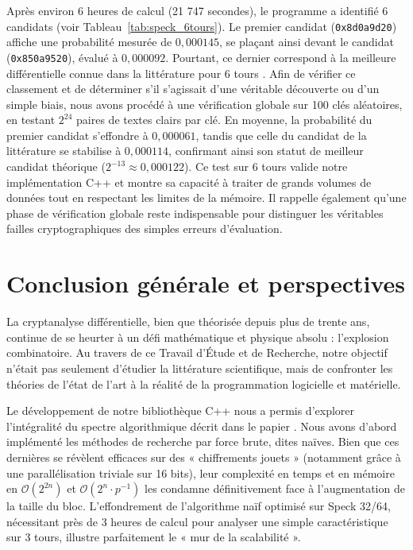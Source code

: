\documentclass[a4paper,11pt]{article}
\begin{document}
Après environ 6 heures de calcul (21 747 secondes), le programme a identifié 6 candidats (voir Tableau~\ref{tab:speck_6tours}). Le premier candidat (\texttt{0x8d0a9d20}) affiche une probabilité mesurée de $0,000145$, se plaçant ainsi devant le candidat (\texttt{0x850a9520}), évalué à $0,000092$. Pourtant, ce dernier correspond à la meilleure différentielle connue dans la littérature pour 6 tours \cite{DDKRS23}. Afin de vérifier ce classement et de déterminer s'il s'agissait d'une véritable découverte ou d'un simple biais, nous avons procédé à une vérification globale sur 100 clés aléatoires, en testant $2^{24}$ paires de textes clairs par clé. En moyenne, la probabilité du premier candidat s'effondre à $0,000061$, tandis que celle du candidat de la littérature se stabilise à $0,000114$, confirmant ainsi son statut de meilleur candidat théorique ($2^{-13} \approx 0,000122$). Ce test sur 6 tours valide notre implémentation C++ et montre sa capacité à traiter de grands volumes de données tout en respectant les limites de la mémoire. Il rappelle également qu'une phase de vérification globale reste indispensable pour distinguer les véritables failles cryptographiques des simples erreurs d'évaluation.

\section{Conclusion générale et perspectives}

La cryptanalyse différentielle, bien que théorisée depuis plus de trente ans, continue de se heurter à un défi mathématique et physique absolu : l'explosion combinatoire. Au travers de ce Travail d'Étude et de Recherche, notre objectif n'était pas seulement d'étudier la littérature scientifique, mais de confronter les théories de l'état de l'art à la réalité de la programmation logicielle et matérielle.

Le développement de notre bibliothèque C++ nous a permis d'explorer l'intégralité du spectre algorithmique décrit dans le papier \cite{DDKRS23}. Nous avons d'abord implémenté les méthodes de recherche par force brute, dites naïves. Bien que ces dernières se révèlent efficaces sur des « chiffrements jouets » (notamment grâce à une parallélisation triviale sur 16 bits), leur complexité en temps et en mémoire en $\mathcal{O}(2^{2n})$ et $\mathcal{O}(2^n \cdot p^{-1})$ les condamne définitivement face à l'augmentation de la taille du bloc. L'effondrement de l'algorithme naïf optimisé sur Speck 32/64, nécessitant près de 3 heures de calcul pour analyser une simple caractéristique sur 3 tours, illustre parfaitement le « mur de la scalabilité ».
\end{document}
